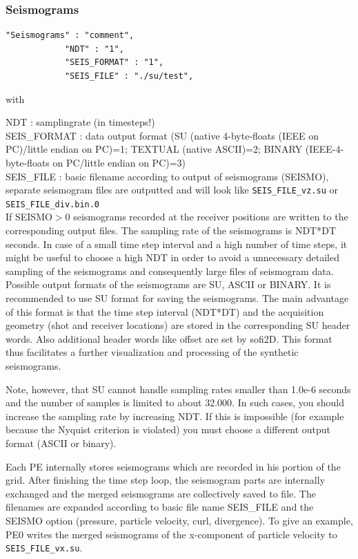 \documentclass[11pt,onecolumn,oneside]{article}
\begin{document}
\subsubsection{Seismograms}
\label{seismograms}
\begin{verbatim}
"Seismograms" : "comment",
			"NDT" : "1",
			"SEIS_FORMAT" : "1",
			"SEIS_FILE" : "./su/test",
\end{verbatim}

with

NDT : samplingrate (in timesteps!)\\
SEIS\_FORMAT : data output format (SU (native 4-byte-floats (IEEE on PC)/little endian on PC)=1; TEXTUAL (native ASCII)=2; BINARY (IEEE-4-byte-floats on PC/little endian on PC)=3)\\
SEIS\_FILE : basic filename according to output of seismograms (SEISMO), separate seismogram files are outputted and will look like \texttt{SEIS\_FILE\_vz.su} or \texttt{SEIS\_FILE\_div.bin.0}\\


If SEISMO$>$0 seismograms recorded at the receiver positions are written to the corresponding output files. The sampling rate of the seismograms is NDT*DT seconds. In case of a small time step interval and a high number of time steps, it might be useful to choose a high NDT in order to avoid a unnecessary detailed sampling of the seismograms and consequently large files of seismogram data. Possible output formats of the seismograms are SU, ASCII or BINARY. It is recommended to use SU format for saving the seismograms. The main advantage of this format is that the time step interval (NDT*DT) and the acquisition geometry (shot and receiver locations) are stored in the corresponding SU header words. Also additional header words like offset are set by sofi2D. This format thus facilitates a further visualization and processing of the synthetic seismograms.

Note, however, that SU cannot handle sampling rates smaller than 1.0e-6 seconds and the number of samples is limited to about 32.000. In such cases, you should increase the sampling rate by increasing NDT. If this is impossible (for example because the Nyquist criterion is violated) you must choose a different output format (ASCII or binary).

Each PE internally stores seismograms which are recorded in his portion of the grid. After finishing the time step loop, the seismogram parts are internally exchanged and the merged seismograms are collectively saved to file. The filenames are expanded according to basic file name SEIS\_FILE and the SEISMO option (pressure, particle velocity, curl, divergence). To give an example, PE0 writes the merged seismograms of the x-component of particle velocity to \texttt{SEIS\_FILE\_vx.su}. 
\end{document}
